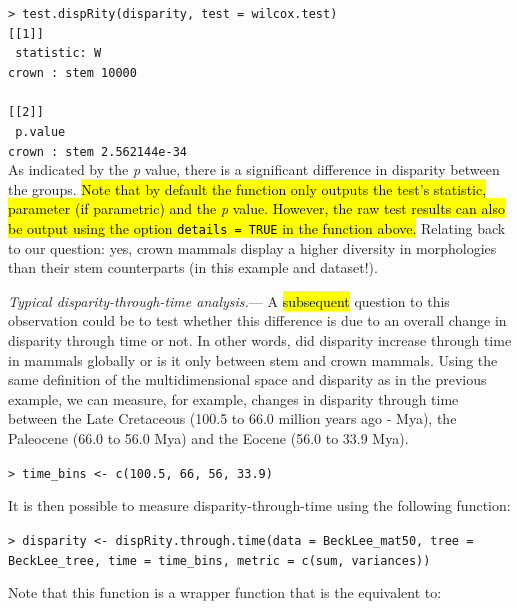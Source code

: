 \documentclass[12pt,letterpaper]{article}
\renewcommand{\subsubsection}[1]{%
\vspace{2ex}
\noindent
\textit{#1.}---}
\begin{document}
\noindent \texttt{> test.dispRity(disparity, test = wilcox.test)}\\

\noindent \texttt{[[1]]}\\
\noindent \texttt{          statistic: W}\\
\noindent \texttt{crown : stem     10000}\\
\noindent \texttt{ }\\
\noindent \texttt{[[2]]}\\
\noindent \texttt{                  p.value}\\
\noindent \texttt{crown : stem 2.562144e-34}\\

\bigskip
As indicated by the \textit{p} value, there is a significant difference in disparity between the groups.
\hl{Note that by default the function only outputs the test's statistic, parameter (if parametric) and the \textit{p} value. However, the raw test results can also be output using the option \texttt{details = TRUE} in the function above.}
Relating back to our question: yes, crown mammals display a higher diversity in morphologies than their stem counterparts (in this example and dataset!).

\subsubsection{Typical disparity-through-time analysis}
A 
\hl{subsequent} 
question to this observation could be to test whether this difference is due to an overall change in disparity through time or not.
In other words, did disparity increase through time in mammals globally or is it only between stem and crown mammals.
Using the same definition of the multidimensional space and disparity as in the previous example, we can measure, for example, changes in disparity through time between the Late Cretaceous (100.5 to 66.0 million years ago - Mya), the Paleocene (66.0 to 56.0 Mya) and the Eocene (56.0 to 33.9 Mya).

\noindent \texttt{> time\_bins <- c(100.5, 66, 56, 33.9)}

It is then possible to measure disparity-through-time using the following function:

\noindent \texttt{> disparity <- dispRity.through.time(data = BeckLee\_mat50, tree = BeckLee\_tree, time = time\_bins, metric = c(sum, variances))}

\noindent Note that this function is a wrapper function that is the equivalent to:
\end{document}
